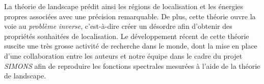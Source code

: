 La théorie de landscape prédit ainsi les régions de localisation et les énergies propres associées avec une précision remarquable. De plus, cette théorie ouvre la voie au \emph{problème inverse}, c'est-à-dire créer un désordre afin d'obtenir des propriétés souhaitées de localisation. Le développement récent de cette théorie suscite une très grosse activité de recherche dans le monde, dont la mise en place d'une collaboration entre les auteurs et notre équipe dans le cadre du projet \emph{SIMONS} afin de reproduire les fonctions spectrales mesurées à l'aide de la théorie de landscape.


